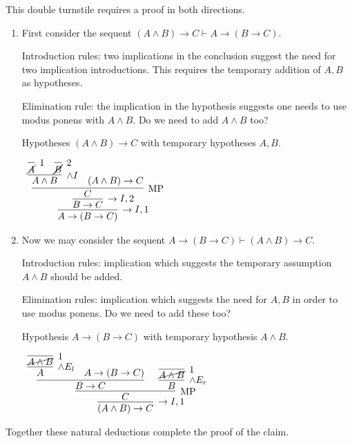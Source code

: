 \documentclass[11pt]{report}
\begin{document}
\begin{enumerate}
\begin{enumerate}
		This double turnstile requires a proof in both directions. 
		
		\begin{enumerate}
		\item First consider the sequent $(A \land B) \to C \vdash A \to (B \to C)$.
		
		\vspace{0.2cm}

		Introduction rules: two implications in the conclusion suggest the need for two implication introductions. This requires the temporary addition of $A,B$ as hypotheses. 

		\vspace{0.2cm}

		Elimination rule: the implication in the hypothesis suggests one needs to use modus ponens with $A \land B$. Do we need to add $A \land B$ too?

		\vspace{0.3cm}
		Hypotheses $(A \land B) \to C$ with temporary hypotheses $A,B$.

		\begin{mdframed}
			\begin{center}
				$\begin{array}{c}
					\infer[\to I,1]{A \to (B \to C)}
						{\infer[\to I,2]{B \to C}
							{\infer[\MP]{C}
								{\infer[\land I]{A \land B}
									{\infer[1]{\cancel{A}}{} & \infer[2]{\cancel{B}}{}}
								&							
								(A \land B) \to C}}}
				\end{array}$
			\end{center}
		\end{mdframed}

		\item Now we may consider the sequent $A \to (B \to C) \vdash (A \land B) \to C$.

		\vspace{0.2cm}

		Introduction rules: implication which suggests the temporary assumption $A\land B$ should be added. 		
		
		\vspace{0.2cm}

		Elimination rules: implication which suggests the need for $A,B$ in order to use modus ponens. Do we need to add these too? 

		\vspace{0.3cm}
		Hypothesis $A \to (B \to C)$ with temporary hypothesis $A \land B$.
		\begin{mdframed}
			\begin{center}
				$\begin{array}{c}
					\infer[\to I,1]{(A \land B) \to C}
						{\infer[\MP]{C}
							{\infer[]{B\to C}
								{\infer[\land E_{l}]{A}{\infer[1]{\cancel{A \land B}}{}} & A \to (B \to C)}
							&
							\infer[\land E_{r}]{B}
								{\infer[1]{\cancel{A \land B}}{}}}}
				\end{array}$
			\end{center}
		\end{mdframed}
	\end{enumerate}
	Together these natural deductions complete the proof of the claim. 
		

\end{enumerate}
\end{enumerate}
\end{document}
